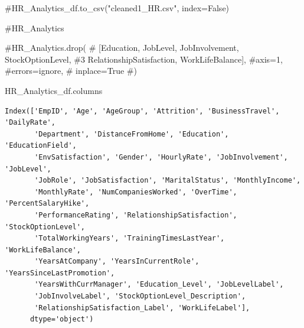 \documentclass[
  letterpaper,
  DIV=11,
  numbers=noendperiod]{scrartcl}
\newenvironment{Shaded}{\begin{snugshade}}{\end{snugshade}}
\newcommand{\CommentTok}[1]{\textcolor[rgb]{0.37,0.37,0.37}{#1}}
\newcommand{\NormalTok}[1]{\textcolor[rgb]{0.00,0.23,0.31}{#1}}
\begin{document}
\begin{Shaded}
\begin{Highlighting}[]
\CommentTok{\#HR\_Analytics\_df.to\_csv("cleaned1\_HR.csv", index=False)}
\end{Highlighting}
\end{Shaded}

\begin{Shaded}
\begin{Highlighting}[]
\CommentTok{\#HR\_Analytics}
\end{Highlighting}
\end{Shaded}

\begin{Shaded}
\begin{Highlighting}[]
\CommentTok{\#HR\_Analytics.drop(}
 \CommentTok{\#   [\textquotesingle{}Education\textquotesingle{}, \textquotesingle{}JobLevel\textquotesingle{}, \textquotesingle{}JobInvolvement\textquotesingle{}, \textquotesingle{}StockOptionLevel\textquotesingle{},}
  \CommentTok{\#3    \textquotesingle{}RelationshipSatisfaction\textquotesingle{}, \textquotesingle{}WorkLifeBalance\textquotesingle{}],}
    \CommentTok{\#axis=1,}
    \CommentTok{\#errors=\textquotesingle{}ignore\textquotesingle{},}
   \CommentTok{\# inplace=True}
\CommentTok{\#)}
\end{Highlighting}
\end{Shaded}

\begin{Shaded}
\begin{Highlighting}[]
\NormalTok{HR\_Analytics\_df.columns}
\end{Highlighting}
\end{Shaded}

\begin{verbatim}
Index(['EmpID', 'Age', 'AgeGroup', 'Attrition', 'BusinessTravel', 'DailyRate',
       'Department', 'DistanceFromHome', 'Education', 'EducationField',
       'EnvSatisfaction', 'Gender', 'HourlyRate', 'JobInvolvement', 'JobLevel',
       'JobRole', 'JobSatisfaction', 'MaritalStatus', 'MonthlyIncome',
       'MonthlyRate', 'NumCompaniesWorked', 'OverTime', 'PercentSalaryHike',
       'PerformanceRating', 'RelationshipSatisfaction', 'StockOptionLevel',
       'TotalWorkingYears', 'TrainingTimesLastYear', 'WorkLifeBalance',
       'YearsAtCompany', 'YearsInCurrentRole', 'YearsSinceLastPromotion',
       'YearsWithCurrManager', 'Education_Level', 'JobLevelLabel',
       'JobInvolveLabel', 'StockOptionLevel_Description',
       'RelationshipSatisfaction_Label', 'WorkLifeLabel'],
      dtype='object')
\end{verbatim}
\end{document}
